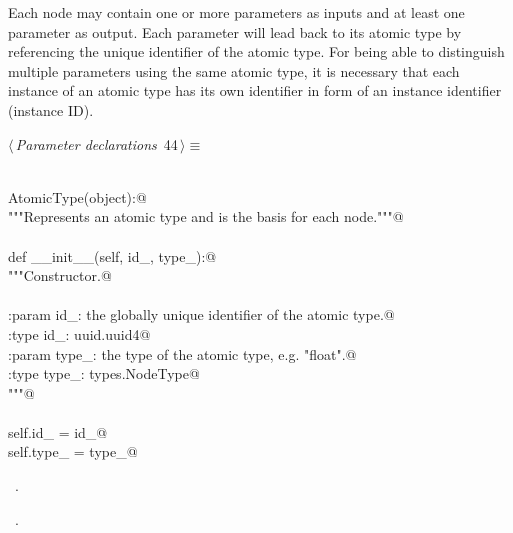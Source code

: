 \documentclass[
    a4paper,      %
    10pt,         %
    openright,    %
    notitlepage,  %
    parskip=half, %
]{scrreprt}       %
\theoremstyle{definition}                    %
\begin{document}
Each node may contain one or more parameters as inputs and at least one
parameter as output. Each parameter will lead back to its atomic type by
referencing the unique identifier of the atomic type. For being able to
distinguish multiple parameters using the same atomic type, it is necessary that
each instance of an atomic type has its own identifier in form of an instance
identifier (instance ID).

\begin{flushleft} \small
\begin{minipage}{\linewidth}\label{scrap55}\raggedright\small
{} $\langle\,${\itshape Parameter declarations}\nobreak\ {\footnotesize {44}}$\,\rangle\equiv$
\vspace{-1exm}
\begin{list}{}{} \item
\mbox{}\lstinline@@\\
\mbox{}\lstinline@class AtomicType(object):@\\
\mbox{}\lstinline@    """Represents an atomic type and is the basis for each node."""@\\
\mbox{}\lstinline@@\\
\mbox{}\lstinline@    def __init__(self, id_, type_):@\\
\mbox{}\lstinline@        """Constructor.@\\
\mbox{}\lstinline@@\\
\mbox{}\lstinline@        :param id_: the globally unique identifier of the atomic type.@\\
\mbox{}\lstinline@        :type  id_: uuid.uuid4@\\
\mbox{}\lstinline@        :param type_: the type of the atomic type, e.g. "float".@\\
\mbox{}\lstinline@        :type  type_: types.NodeType@\\
\mbox{}\lstinline@        """@\\
\mbox{}\lstinline@@\\
\mbox{}\lstinline@        self.id_   = id_@\\
\mbox{}\lstinline@        self.type_ = type_@\\
\mbox{}\lstinline@@{\NWsep}
\end{list}
\vspace{-1.5ex}
\footnotesize
\begin{list}{}{\setlength{\itemsep}{-\parsep}\setlength{\itemindent}{-\leftmargin}}
\item \NWtxtMacroDefBy\ .
\item \NWtxtMacroRefIn\ .

\item{}
\end{list}
\end{minipage}\vspace{4ex}
\end{flushleft}
\end{document}
